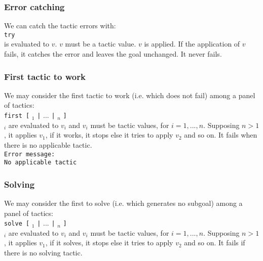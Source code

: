 \subsubsection{Error catching}

We can catch the tactic errors with:\\

{\tt try} {\tacexpr}\\

{\tacexpr} is evaluated to $v$. $v$ must be a tactic value. $v$ is
applied. If the application of $v$ fails, it catches the error and
leaves the goal unchanged.  It never fails.

\subsubsection{First tactic to work}

We may consider the first tactic to work (i.e. which does not fail) among a
panel of tactics:\\

{\tt first [} {\tacexpr}$_1$ {\tt |} $...$ {\tt |} {\tacexpr}$_n$ {\tt ]}\\

{\tacexpr}$_i$ are evaluated to $v_i$ and $v_i$ must be tactic values, for 
$i=1,...,n$. Supposing $n>1$, it applies $v_1$, if it works, it stops else it
tries to apply $v_2$ and so on. It fails when there is no applicable tactic.\\

{\tt Error message:}\\

{\tt No applicable tactic}

\subsubsection{Solving}

We may consider the first to solve (i.e. which generates no subgoal) among a
panel of tactics:\\

{\tt solve [} {\tacexpr}$_1$ {\tt |} $...$ {\tt |} {\tacexpr}$_n$ {\tt ]}\\

{\tacexpr}$_i$ are evaluated to $v_i$ and $v_i$ must be tactic values, for 
$i=1,...,n$. Supposing $n>1$, it applies $v_1$, if it solves, it stops else it
tries to apply $v_2$ and so on. It fails if there is no solving tactic.\\

